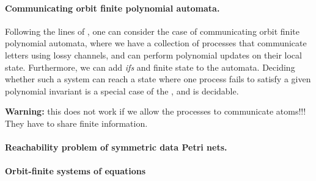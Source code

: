 \paragraph{Communicating orbit finite polynomial automata.} Following the lines
of \cite{JGL10}, one can consider the case of communicating orbit finite
polynomial automata, where we have a collection of processes that communicate
letters using lossy channels, and can perform polynomial updates on their local
state. Furthermore, we can add \emph{ifs} and finite state to the automata.
Deciding whether such a system can reach a state where one process fails to
satisfy a given polynomial invariant is a special case of the , and is decidable.

\textbf{Warning:} this does not work if we allow the processes to communicate 
atoms!!! They have to share finite information.


\paragraph{Reachability problem of symmetric data Petri nets.}


\paragraph{Orbit-finite systems of equations}

